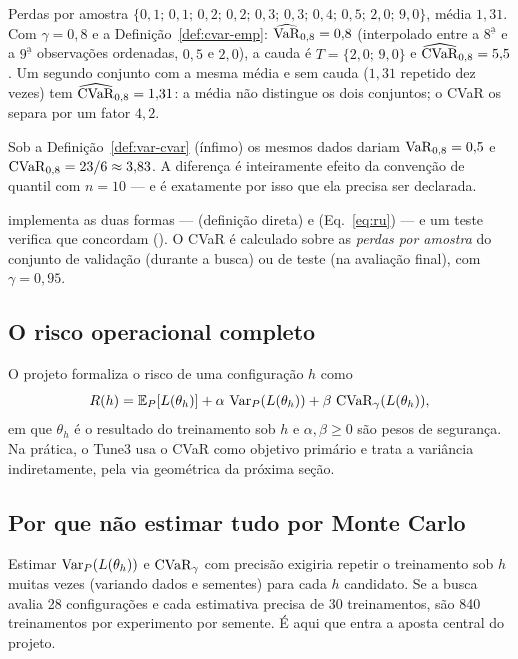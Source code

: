 \begin{exemplo}\label{ex:cvar}
Perdas por amostra $\{0{,}1;\,0{,}1;\,0{,}2;\,0{,}2;\,0{,}3;\,0{,}3;\,0{,}4;\,0{,}5;\,2{,}0;\,9{,}0\}$, média $1{,}31$. Com $\gamma=0{,}8$ e a Definição~\ref{def:cvar-emp}: $\widehat{\operatorname{VaR}}_{0{,}8}=0{,}8$ (interpolado entre a $8^{\underline{\text{a}}}$ e a $9^{\underline{\text{a}}}$ observações ordenadas, $0{,}5$ e $2{,}0$), a cauda é $T=\{2{,}0;\,9{,}0\}$ e $\widehat{\operatorname{CVaR}}_{0{,}8}=5{,}5$. Um segundo conjunto com a mesma média e sem cauda ($1{,}31$ repetido dez vezes) tem $\widehat{\operatorname{CVaR}}_{0{,}8}=1{,}31$: a média não distingue os dois conjuntos; o CVaR os separa por um fator $4{,}2$.

Sob a Definição~\ref{def:var-cvar} (ínfimo) os mesmos dados dariam $\operatorname{VaR}_{0{,}8}=0{,}5$ e $\operatorname{CVaR}_{0{,}8}=23/6\approx3{,}83$. A diferença é inteiramente efeito da convenção de quantil com $n=10$ --- e é exatamente por isso que ela precisa ser declarada.
\end{exemplo}

\begin{codigo}[No código]
 implementa as duas formas ---  (definição direta) e  (Eq.~\ref{eq:ru}) --- e um teste verifica que concordam (). O CVaR é calculado sobre as \emph{perdas por amostra} do conjunto de validação (durante a busca) ou de teste (na avaliação final), com $\gamma=0{,}95$.
\end{codigo}

\subsection{O risco operacional completo}
O projeto formaliza o risco de uma configuração $h$ como
\begin{equation}\label{eq:risco}
R(h)=\mathbb{E}_P[L(\theta_h)]+\alpha\,\operatorname{Var}_P(L(\theta_h))+\beta\,\operatorname{CVaR}_\gamma(L(\theta_h)),
\end{equation}
em que $\theta_h$ é o resultado do treinamento sob $h$ e $\alpha,\beta\ge0$ são pesos de segurança. Na prática, o Tune3 usa o CVaR como objetivo primário e trata a variância indiretamente, pela via geométrica da próxima seção.

\subsection{Por que não estimar tudo por Monte Carlo}
Estimar $\operatorname{Var}_P(L(\theta_h))$ e $\operatorname{CVaR}_\gamma$ com precisão exigiria repetir o treinamento sob $h$ muitas vezes (variando dados e sementes) para cada $h$ candidato. Se a busca avalia 28 configurações e cada estimativa precisa de 30 treinamentos, são 840 treinamentos por experimento por semente. É aqui que entra a aposta central do projeto.

